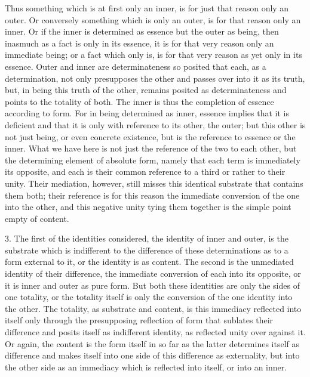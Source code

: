 Thus something which is at first only an inner,
is for just that reason only an outer.
Or conversely something which is only an outer,
is for that reason only an inner.
Or if the inner is determined as essence
but the outer as being,
then inasmuch as a fact is only in its essence,
it is for that very reason only an immediate being;
or a fact which only is, is for that very reason
as yet only in its essence.
Outer and inner are determinateness so posited that
each, as a determination, not only presupposes the other and passes over
into it as its truth,
but, in being this truth of the other, remains posited
as determinateness and points to the totality of both.
The inner is thus the completion of essence according to form.
For in being determined as inner, essence implies that it is deficient
and that it is only with reference to its other, the outer;
but this other is not just being, or even concrete existence,
but is the reference to essence or the inner.
What we have here is not just the reference of the two to each other,
but the determining element of absolute form,
namely that each term is immediately its opposite,
and each is their common reference to a third or rather to their unity.
Their mediation, however, still misses this identical substrate
that contains them both;
their reference is for this reason the immediate
conversion of the one into the other,
and this negative unity tying them together is
the simple point empty of content.

3. The first of the identities considered, the identity of inner and outer,
is the substrate which is indifferent to the difference of these determinations
as to a form external to it, or the identity is as content.
The second is the unmediated identity of their difference,
the immediate conversion of each into its opposite,
or it is inner and outer as pure form.
But both these identities are only the sides of one totality,
or the totality itself is only the conversion of the one identity into the other.
The totality, as substrate and content, is this immediacy reflected into itself
only through the presupposing reflection of form that sublates their difference
and posits itself as indifferent identity,
as reflected unity over against it.
Or again, the content is the form itself
in so far as the latter determines itself as difference
and makes itself into one side of this difference as externality,
but into the other side as an immediacy which is reflected into itself,
or into an inner.

